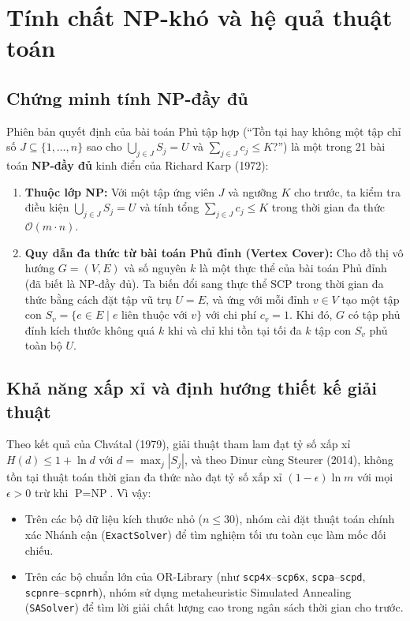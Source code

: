 \documentclass[11pt, a4paper]{article}
\begin{document}
\section{Tính chất NP-khó và hệ quả thuật toán}

\subsection{Chứng minh tính NP-đầy đủ}
Phiên bản quyết định của bài toán Phủ tập hợp (``Tồn tại hay không một tập chỉ số $J \subseteq \{1, \dots, n\}$ sao cho $\bigcup_{j \in J} S_j = U$ và $\sum_{j \in J} c_j \le K$?'') là một trong 21 bài toán \textbf{NP-đầy đủ} kinh điển của Richard Karp (1972):
\begin{enumerate}
    \item \textbf{Thuộc lớp NP:} Với một tập ứng viên $J$ và ngưỡng $K$ cho trước, ta kiểm tra điều kiện $\bigcup_{j \in J} S_j = U$ và tính tổng $\sum_{j \in J} c_j \le K$ trong thời gian đa thức $\mathcal{O}(m \cdot n)$.
    \item \textbf{Quy dẫn đa thức từ bài toán Phủ đỉnh (Vertex Cover):} Cho đồ thị vô hướng $G = (V, E)$ và số nguyên $k$ là một thực thể của bài toán Phủ đỉnh (đã biết là NP-đầy đủ). Ta biến đổi sang thực thể SCP trong thời gian đa thức bằng cách đặt tập vũ trụ $U = E$, và ứng với mỗi đỉnh $v \in V$ tạo một tập con $S_v = \{e \in E \mid e \text{ liên thuộc với } v\}$ với chi phí $c_v = 1$. Khi đó, $G$ có tập phủ đỉnh kích thước không quá $k$ khi và chỉ khi tồn tại tối đa $k$ tập con $S_v$ phủ toàn bộ $U$.
\end{enumerate}

\subsection{Khả năng xấp xỉ và định hướng thiết kế giải thuật}
Theo kết quả của Chvátal (1979), giải thuật tham lam đạt tỷ số xấp xỉ $H(d) \le 1 + \ln d$ với $d = \max_j |S_j|$, và theo Dinur cùng Steurer (2014), không tồn tại thuật toán thời gian đa thức nào đạt tỷ số xấp xỉ $(1 - \epsilon)\ln m$ với mọi $\epsilon > 0$ trừ khi $\text{P} = \text{NP}$. Vì vậy:
\begin{itemize}
    \item Trên các bộ dữ liệu kích thước nhỏ ($n \le 30$), nhóm cài đặt thuật toán chính xác Nhánh cận (\texttt{ExactSolver}) để tìm nghiệm tối ưu toàn cục làm mốc đối chiếu.
    \item Trên các bộ chuẩn lớn của OR-Library (như \texttt{scp4x}--\texttt{scp6x}, \texttt{scpa}--\texttt{scpd}, \texttt{scpnre}--\texttt{scpnrh}), nhóm sử dụng metaheuristic Simulated Annealing (\texttt{SASolver}) để tìm lời giải chất lượng cao trong ngân sách thời gian cho trước.
\end{itemize}
\end{document}

